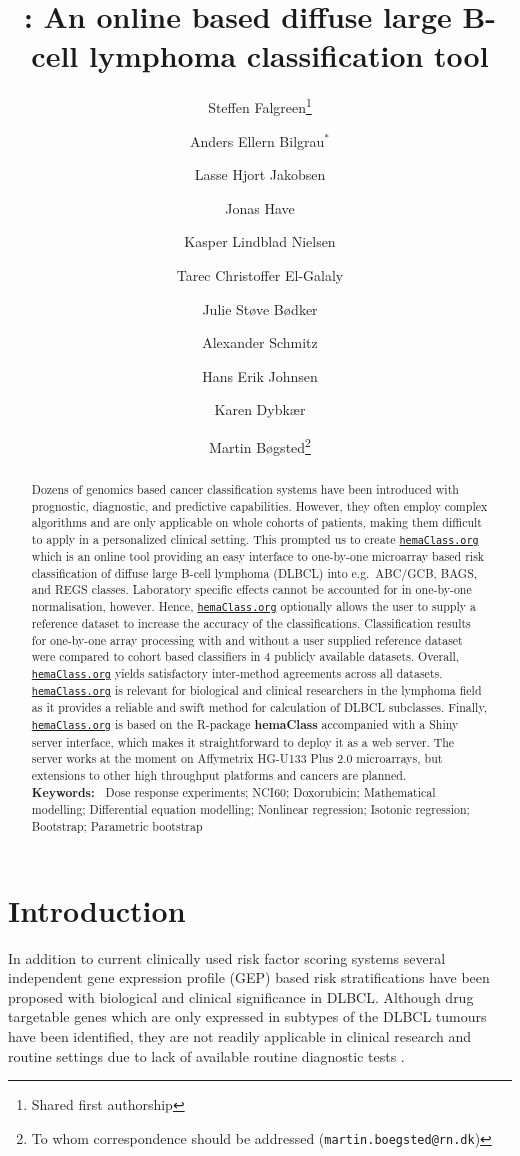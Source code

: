 \documentclass{article}
\title{\hemaClass{}: An online based diffuse large B-cell lymphoma classification tool}
\author[1]{Steffen Falgreen\thanks{Shared first authorship}}
\author[13]{Anders Ellern Bilgrau$^\ast$}
\author[13]{Lasse Hjort Jakobsen}
\author[13]{Jonas Have}
\author[13]{Kasper Lindblad Nielsen}
\author[1]{Tarec Christoffer El-Galaly}
\author[1]{Julie St{\o}ve  B{\o}dker}
\author[1]{Alexander Schmitz}
\author[13]{Hans Erik Johnsen}
\author[13]{Karen Dybk{\ae}r}
\author[13]{Martin B{\o}gsted\thanks{To whom correspondence should be addressed (\texttt{martin.boegsted@rn.dk})}}
\affil[1]{Department of Haematology, Aalborg University Hospital}
\affil[2]{Department of Mathematical Sciences, Aalborg University}
\affil[3]{Department of Clinical Medicine, Aalborg University}
\newcommand{\hemaClass}{\href{http://hemaClass.org}{\texttt{hemaClass.org}}}
\newcommand{\R}{\textsf{R}}
\newcommand{\pkg}[1]{\textbf{#1}}
\begin{document}
\maketitle
{}
{}
\begin{abstract}
Dozens of genomics based cancer classification systems have been introduced with prognostic, diagnostic, and predictive capabilities.
However, they often employ complex algorithms and are only applicable on whole cohorts of patients, making them difficult to apply in a personalized clinical setting.
This prompted us to create \hemaClass{} which is an online tool providing an easy interface to one-by-one microarray based risk classification of diffuse large B-cell lymphoma (DLBCL) into e.g.\ ABC/GCB, BAGS, and REGS classes.
Laboratory specific effects cannot be accounted for in one-by-one normalisation, however.
Hence, \hemaClass{} optionally allows the user to supply a reference dataset to increase the accuracy of the classifications.
Classification results for one-by-one array processing with and without a user supplied reference dataset were compared to cohort based classifiers in $4$ publicly available datasets.
Overall, \hemaClass{} yields satisfactory inter-method agreements across all datasets.
 \hemaClass{} is relevant for biological and clinical researchers in the lymphoma field as it provides a reliable and swift method for calculation of DLBCL subclasses.
Finally, \hemaClass{} is based on the \R{}-package \pkg{hemaClass} accompanied with a Shiny server interface, which makes it straightforward to deploy it as a web server. The server works at the moment on Affymetrix HG-U133 Plus 2.0 microarrays, but extensions to other high throughput platforms and cancers are planned.
\medskip\\
\textbf{Keywords:~}
Dose response experiments; NCI60; Doxorubicin; Mathematical modelling; Differential equation modelling; Nonlinear regression; Isotonic regression; Bootstrap; Parametric bootstrap
\end{abstract}



\section{Introduction}

In addition to current clinically used risk factor scoring systems several independent gene expression profile (GEP) based risk stratifications have been proposed with biological and clinical significance in DLBCL.
Although drug targetable genes which are only expressed in subtypes of the DLBCL tumours have been identified, they are not readily applicable in clinical research and routine settings due to lack of available routine diagnostic tests \citep{Jaffe2009}.
\end{document}

